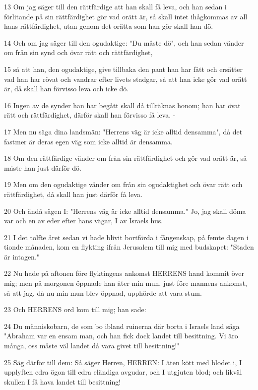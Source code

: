 \par 13 Om jag säger till den rättfärdige att han skall få leva, och han sedan i förlitande på sin rättfärdighet gör vad orätt är, så skall intet ihågkommas av all hans rättfärdighet, utan genom det orätta som han gör skall han dö.
\par 14 Och om jag säger till den ogudaktige: "Du måste dö", och han sedan vänder om från sin synd och övar rätt och rättfärdighet,
\par 15 så att han, den ogudaktige, give tillbaka den pant han har fått och ersätter vad han har rövat och vandrar efter livets stadgar, så att han icke gör vad orätt är, då skall han förvisso leva och icke dö.
\par 16 Ingen av de synder han har begått skall då tillräknas honom; han har övat rätt och rättfärdighet, därför skall han förvisso få leva. -
\par 17 Men nu säga dina landsmän: "Herrens väg är icke alltid densamma", då det fastmer är deras egen väg som icke alltid är densamma.
\par 18 Om den rättfärdige vänder om från sin rättfärdighet och gör vad orätt är, så måste han just därför dö.
\par 19 Men om den ogudaktige vänder om från sin ogudaktighet och övar rätt och rättfärdighet, då skall han just därför få leva.
\par 20 Och ändå sägen I: "Herrens väg är icke alltid densamma." Jo, jag skall döma var och en av eder efter hans vägar, I av Israels hus.
\par 21 I det tolfte året sedan vi hade blivit bortförda i fångenskap, på femte dagen i tionde månaden, kom en flykting ifrån Jerusalem till mig med budskapet: "Staden är intagen."
\par 22 Nu hade på aftonen före flyktingens ankomst HERRENS hand kommit över mig; men på morgonen öppnade han åter min mun, just före mannens ankomst, så att jag, då nu min mun blev öppnad, upphörde att vara stum.
\par 23 Och HERRENS ord kom till mig; han sade:
\par 24 Du människobarn, de som bo ibland ruinerna där borta i Israels land säga "Abraham var en ensam man, och han fick dock landet till besittning. Vi äro många, oss måste väl landet då vara givet till besittning!"
\par 25 Säg därför till dem: Så säger Herren, HERREN: I äten kött med blodet i, I upplyften edra ögon till edra eländiga avgudar, och I utgjuten blod; och likväl skullen I få hava landet till besittning!
